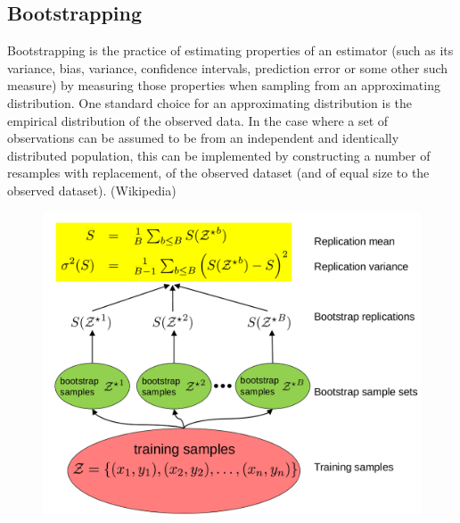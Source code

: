 \documentclass[MachineLearning]{subfiles}
\begin{document}
\subsection{Bootstrapping}
Bootstrapping is the practice of estimating properties of an estimator (such as its variance, bias, variance, confidence intervals, prediction error or some other such measure) by measuring those properties when sampling from an approximating distribution. One standard choice for an approximating distribution is the empirical distribution of the observed data. In the case where a set of observations can be assumed to be from an independent and identically distributed population, this can be implemented by constructing a number of resamples with replacement, of the observed dataset (and of equal size to the observed dataset). (Wikipedia)

\begin{figure}[H]
\centering
\includegraphics[width=0.8\linewidth]{figs/bootstrapping-process}
\end{figure}
\end{document}
